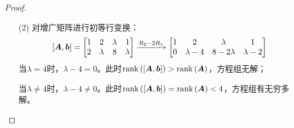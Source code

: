 \begin{proof}
    \begin{enumerate}
        \item[(2)] 对增广矩阵进行初等行变换：
            \begin{equation*}
                \left[ \boldsymbol{A},\boldsymbol{b} \right]=
                \begin{bmatrix}
                    1 & 2       & \lambda & 1       \\
                    2 & \lambda & 8       & \lambda
                \end{bmatrix}\xrightarrow{R_2-2R_1}
                \begin{bmatrix}
                    1 & 2         & \lambda    & 1         \\
                    0 & \lambda-4 & 8-2\lambda & \lambda-2
                \end{bmatrix}
            \end{equation*}
            当\(\lambda=4\)时，\(\lambda-4=0\)。此时\(\mathrm{rank}\left( \left[ \boldsymbol{A},\boldsymbol{b} \right] \right)>\mathrm{rank}\left( \boldsymbol{A} \right)\)，方程组无解；

            当\(\lambda\neq4\)时，\(\lambda-4\neq0\)。此时\(\mathrm{rank}\left( \left[ \boldsymbol{A},\boldsymbol{b} \right] \right)=\mathrm{rank}\left( \boldsymbol{A} \right)<4\)，方程组有无穷多解。
    \end{enumerate}
\end{proof}

